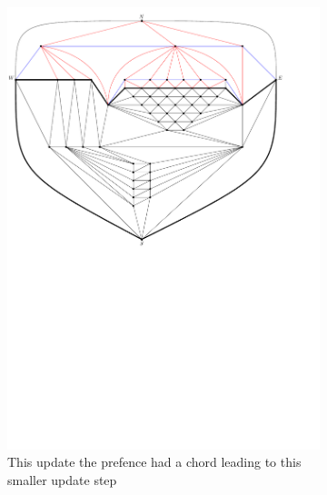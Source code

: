 \begin{figure}
    \ContinuedFloat
    \begin{subfigure}[b]{.9 \textwidth}
      \includegraphics[width=\textwidth]{examples/img/vertWorstCase/sweep3}
      \caption{This update the prefence had a chord leading to this smaller update step}
      \label{fig:ex:vert:sweep3}
    \end{subfigure}
    ~
    \begin{subfigure}[b]{.9 \textwidth}

\end{subfigure}
\end{figure}
